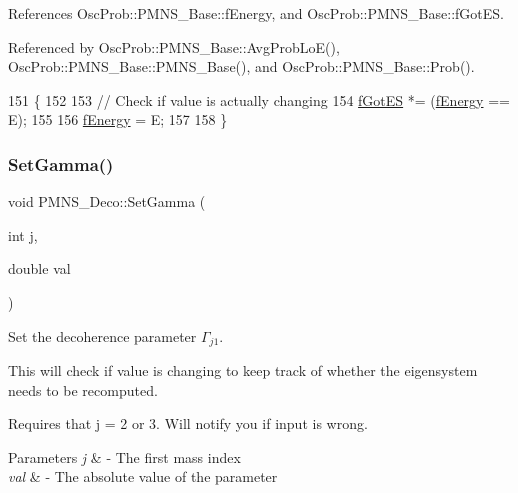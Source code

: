 References Osc\+Prob\+::\+P\+M\+N\+S\+\_\+\+Base\+::f\+Energy, and Osc\+Prob\+::\+P\+M\+N\+S\+\_\+\+Base\+::f\+Got\+ES.



Referenced by Osc\+Prob\+::\+P\+M\+N\+S\+\_\+\+Base\+::\+Avg\+Prob\+Lo\+E(), Osc\+Prob\+::\+P\+M\+N\+S\+\_\+\+Base\+::\+P\+M\+N\+S\+\_\+\+Base(), and Osc\+Prob\+::\+P\+M\+N\+S\+\_\+\+Base\+::\+Prob().


\begin{DoxyCode}
151 \{
152 
153   \textcolor{comment}{// Check if value is actually changing}
154   \hyperlink{classOscProb_1_1PMNS__Base_a6dc5cd010d2d70b2324745b4e53e9839}{fGotES} *= (\hyperlink{classOscProb_1_1PMNS__Base_a2800af6d436972f3e900867790c046b0}{fEnergy} == E);
155 
156   \hyperlink{classOscProb_1_1PMNS__Base_a2800af6d436972f3e900867790c046b0}{fEnergy} = E;
157 
158 \}
\end{DoxyCode}
\mbox{\label{classOscProb_1_1PMNS__Deco_ac06a9c503d1c5b4a43c4eb797881898d}} 
\subsubsection{\texorpdfstring{Set\+Gamma()}{SetGamma()}}
{\footnotesize\ttfamily void P\+M\+N\+S\+\_\+\+Deco\+::\+Set\+Gamma (\begin{DoxyParamCaption}\item[{int}]{j,  }\item[{double}]{val }\end{DoxyParamCaption})\hspace{0.3cm}{\ttfamily [virtual]}}

Set the decoherence parameter $\Gamma_{j1}$.

This will check if value is changing to keep track of whether the eigensystem needs to be recomputed.

Requires that j = 2 or 3. Will notify you if input is wrong.


\begin{DoxyParams}{Parameters}
{\em j} & -\/ The first mass index \\
\hline
{\em val} & -\/ The absolute value of the parameter \\
\hline
\end{DoxyParams}


